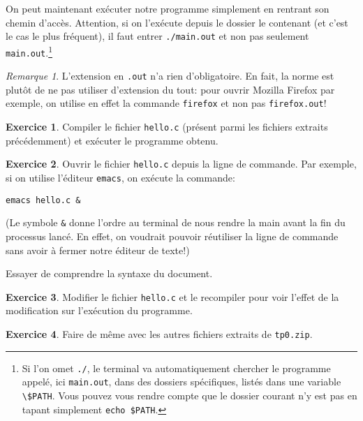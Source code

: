 \documentclass[10pt,french,a4paper]{article}
\theoremstyle{definition}
\newtheorem{exercise}{Exercice}
\theoremstyle{remark}
\newtheorem*{remark}{Remarque}
\newcommand{\shell}[1]{\lstinline[style=sh]|#1|}
\begin{document}
On peut maintenant exécuter notre programme simplement en rentrant son
chemin d'accès. Attention, si on l'exécute depuis le dossier le
contenant (et c'est le cas le plus fréquent), il faut entrer
\shell{./main.out} et non pas seulement \shell{main.out}.\footnote{Si
  l'on omet \shell{./}, le terminal va automatiquement chercher le
  programme appelé, ici \shell{main.out}, dans des dossiers
  spécifiques, listés dans une variable
  \shell{\$PATH}. Vous pouvez vous rendre compte que le dossier courant
  n'y est pas en tapant simplement {\tt echo \$PATH}. }

\begin{remark}
  L'extension en \shell{.out} n'a rien d'obligatoire. En fait, la
  norme est plutôt de ne pas utiliser d'extension du tout: pour ouvrir
  Mozilla Firefox par exemple, on utilise en effet la commande
  \shell{firefox} et non pas \shell{firefox.out}!
\end{remark}

\begin{exercise}
  Compiler le fichier \shell{hello.c} (présent parmi les fichiers
  extraits précédemment) et exécuter le programme obtenu.
\end{exercise}

\begin{exercise}
  Ouvrir le fichier \shell{hello.c} depuis la ligne de commande. Par
  exemple, si on utilise l'éditeur \shell{emacs}, on exécute la
  commande:
  \begin{lstlisting}[style=sh]
    emacs hello.c &
  \end{lstlisting}
  (Le symbole \shell{&} donne l'ordre au terminal de nous rendre la
  main avant la fin du processus lancé. En effet, on voudrait pouvoir
  réutiliser la ligne de commande sans avoir à fermer notre éditeur de
  texte!)

  Essayer de comprendre la syntaxe du document.
\end{exercise}

\begin{exercise}
  Modifier le fichier \shell{hello.c} et le recompiler pour voir
  l'effet de la modification sur l'exécution du programme.
\end{exercise}

\begin{exercise}
  Faire de même avec les autres fichiers extraits de \shell{tp0.zip}.
\end{exercise}
\end{document}
